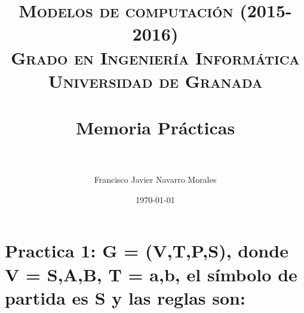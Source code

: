 


\title{	
\normalfont \normalsize 
\textsc{{\bf Modelos de computación (2015-2016)} \\ Grado en Ingeniería Informática \\ Universidad de Granada} \\ [25pt] %
\horrule{0.5pt} \\[0.4cm] %
\huge Memoria Prácticas \\ %
\horrule{2pt} \\[0.5cm] %
}

\author{Francisco Javier Navarro Morales} %

\date{\normalsize\today} %




\maketitle %

\newpage %

\tableofcontents %



\newpage


\section{Practica 1: G = (V,T,P,S), donde V = {S,A,B}, T = {a,b}, el símbolo de partida es S y las reglas son:}

